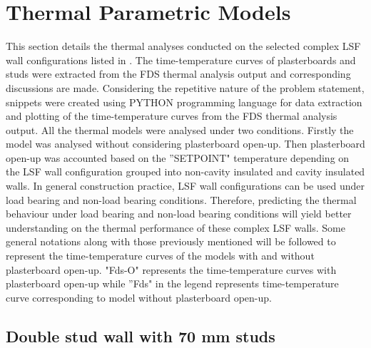 \section{Thermal Parametric Models}\label{sec:thermal-parametric-models}

This section details the thermal analyses conducted on the selected complex LSF wall configurations listed in . The time-temperature curves of plasterboards and studs were extracted from the FDS thermal analysis output and corresponding discussions are made. Considering the repetitive nature of the problem statement, snippets were created using PYTHON programming language for data extraction and plotting of the time-temperature curves from the FDS thermal analysis output. All the thermal models were analysed under two conditions. Firstly the model was analysed without considering plasterboard open-up. Then plasterboard open-up was accounted based on the ''SETPOINT" temperature depending on the LSF wall configuration grouped into non-cavity insulated and cavity insulated walls. In general construction practice, LSF wall configurations can be used under load bearing and non-load bearing conditions. Therefore, predicting the thermal behaviour under load bearing and non-load bearing conditions will yield better understanding on the thermal performance of these complex LSF walls. Some general notations along with those previously mentioned will be followed to represent the time-temperature curves of the models with and without plasterboard open-up. "Fds-O" represents the time-temperature curves with plasterboard open-up while ''Fds" in the legend represents time-temperature curve corresponding to model without plasterboard open-up.

\subsection{Double stud wall with 70 mm studs}\label{sec:ds-70-thermal-fds}

